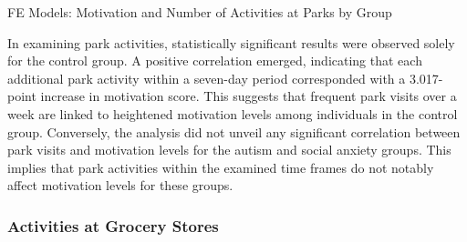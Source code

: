 \documentclass[
  letterpaper,
  number,
  review,
  3p]{elsarticle}
\begin{document}
\begin{table}

\caption{\label{tbl-groupFEParks}FE Models: Motivation and Number of
Activities at Parks by Group}


\end{table}%

In examining park activities, statistically significant results were
observed solely for the control group. A positive correlation emerged,
indicating that each additional park activity within a seven-day period
corresponded with a 3.017-point increase in motivation score. This
suggests that frequent park visits over a week are linked to heightened
motivation levels among individuals in the control group. Conversely,
the analysis did not unveil any significant correlation between park
visits and motivation levels for the autism and social anxiety groups.
This implies that park activities within the examined time frames do not
notably affect motivation levels for these groups.

\subsubsection{Activities at Grocery
Stores}\label{activities-at-grocery-stores}
\end{document}
